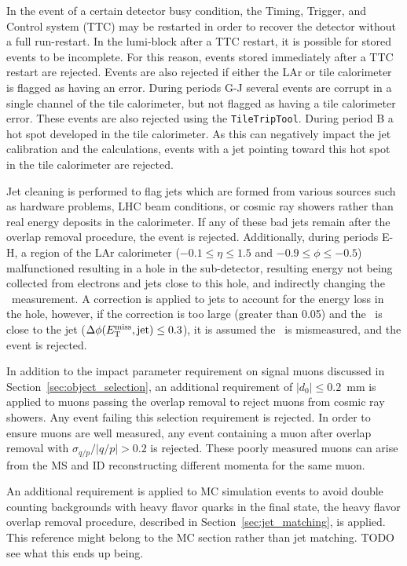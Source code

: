 In the event of a certain detector busy condition, the Timing, Trigger, and
Control system (TTC) may be restarted in order to recover the detector without
a full run-restart.
In the lumi-block after a TTC restart, it is possible for stored events to be
incomplete.
For this reason, events stored immediately after a TTC restart are rejected.
Events are also rejected if either the LAr or tile calorimeter is
flagged as having an error.
During periods G-J several events are corrupt in a single channel of the tile
calorimeter, but not flagged as having a tile calorimeter error.
These events are also rejected using the \texttt{TileTripTool}.
During period B a hot spot developed in the tile calorimeter.
As this can negatively impact the jet calibration and the \met calculations,
events with a jet pointing toward this hot spot in the tile calorimeter are
rejected.

Jet cleaning is performed to flag jets which are formed from various sources
such as hardware problems, LHC beam conditions, or cosmic ray showers rather
than real energy deposits in the calorimeter.
If any of these bad jets remain after the overlap removal procedure, the event
is rejected.
Additionally, during periods E-H, a region of the LAr
calorimeter ($-0.1\le\eta\le1.5$ and $-0.9\le\phi\le-0.5$) malfunctioned
resulting in a hole in the sub-detector, resulting energy not being collected
from electrons and jets close to this hole, and indirectly changing
the \met\ measurement.
A correction is applied to jets to account for the energy loss in the hole,
however, if the correction is too large (greater than 0.05) and the \met\ is
close to the jet ($\Delta\phi(E_{\mathrm{T}}^{\mathrm{miss}}, \text{jet}) \le 0.3$), it is assumed the
\met\ is mismeasured, and the event is rejected.

In addition to the impact parameter requirement on signal muons discussed in
Section~\ref{sec:object_selection}, an additional requirement of
$|d_0| \leq 0.2$~mm is applied to muons passing the overlap removal to reject
muons from cosmic ray showers. Any event failing this selection requirement is
rejected.
In order to ensure muons are well measured, any event containing a muon after
overlap removal with $\sigma_{q/p}/|q/p| > 0.2$ is rejected.
These poorly measured muons can arise from the MS and ID reconstructing
different momenta for the same muon.

An additional requirement is applied to MC simulation events to avoid double
counting backgrounds with heavy flavor quarks in the final state, the heavy
flavor overlap removal procedure, described in Section~\ref{sec:jet_matching},
is applied.
{\color{red} This reference might belong to the MC section rather than jet
matching. TODO see what this ends up being.}

